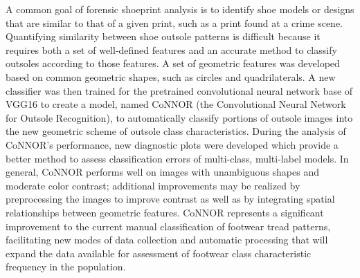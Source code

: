 
A common goal of forensic shoeprint analysis is to identify shoe models or designs that are similar to that of a given print, such as a print found at a crime scene. Quantifying similarity between shoe outsole patterns is difficult because it requires both a set of well-defined features and an accurate method to classify outsoles according to those features. A set of geometric features was developed based on common geometric shapes, such as circles and quadrilaterals. A new classifier was then trained for the pretrained convolutional neural network base of VGG16 to create a model, named CoNNOR (the Convolutional Neural Network for Outsole Recognition), to automatically classify portions of outsole images into the new geometric scheme of outsole class characteristics. During the analysis of CoNNOR's performance, new diagnostic plots were developed which provide a better method to assess classification errors of multi-class, multi-label models. In general, CoNNOR performs well on images with unambiguous shapes and moderate color contrast; additional improvements may be realized by preprocessing the images to improve contrast as well as by integrating spatial relationships between geometric features. CoNNOR represents a significant improvement to the current manual classification of footwear tread patterns, facilitating new modes of data collection and automatic processing that will expand the data available for assessment of footwear class characteristic frequency in the population.
